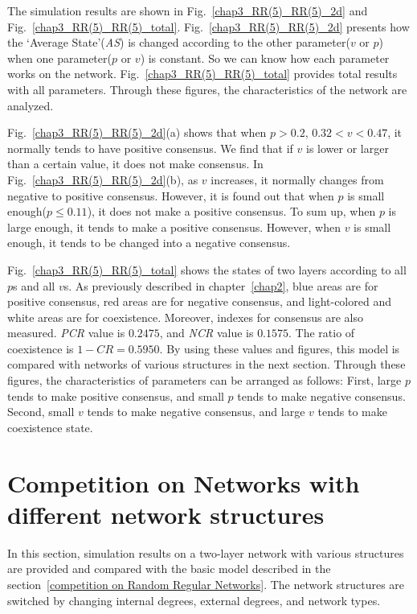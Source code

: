 The simulation results are shown in Fig.~\ref{chap3_RR(5)_RR(5)_2d} and Fig.~\ref{chap3_RR(5)_RR(5)_total}.  Fig.~\ref{chap3_RR(5)_RR(5)_2d} presents how the `Average State'(\textit{AS}) is changed according to the other parameter($v$ or $p$) when one parameter($p$ or $v$) is constant. So we can know how each parameter works on the network. Fig.~\ref{chap3_RR(5)_RR(5)_total} provides total results with all parameters. Through these figures, the characteristics of the network are analyzed.

Fig.~\ref{chap3_RR(5)_RR(5)_2d}(a) shows that when $p > 0.2$, $0.32 < v < 0.47$, it normally tends to have positive consensus. We find that if $v$ is lower or larger than a certain value, it does not make consensus. In Fig.~\ref{chap3_RR(5)_RR(5)_2d}(b), as $v$ increases, it normally changes from negative to positive consensus. However, it is found out that when $p$ is small enough($p \le 0.11$), it does not make a positive consensus.  To sum up, when $p$ is large enough, it tends to make a positive consensus. However, when $v$ is small enough, it tends to be changed into a negative consensus.

Fig.~\ref{chap3_RR(5)_RR(5)_total} shows the states of two layers according to all $p$s and all $v$s. As previously described in chapter~\ref{chap2}, blue areas are for positive consensus, red areas are for negative consensus, and light-colored and white areas are for coexistence. Moreover, indexes for consensus are also measured. \textit{PCR} value is $0.2475$, and \textit{NCR} value is $0.1575$. The ratio of coexistence is $1 - CR = 0.5950$. By using these values and figures, this model is compared with networks of various structures in the next section. Through these figures, the characteristics of parameters can be arranged as follows: First, large $p$ tends to make positive consensus, and small $p$ tends to make negative consensus. Second, small $v$ tends to make negative consensus, and large $v$ tends to make coexistence state. \\


\section{Competition on Networks with different network structures}
In this section, simulation results on a two-layer network with various structures are provided and compared with the basic model described in the section~\ref{competition on Random Regular Networks}.
The network structures are switched by changing internal degrees, external degrees, and network types. \\

